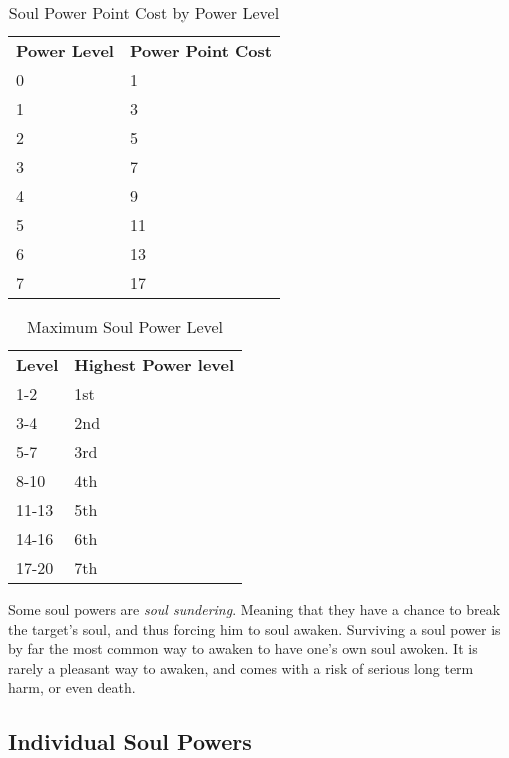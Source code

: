 \begin{table}[!htb]
  \caption{Soul Power Point Cost by Power Level}
  \begin{tabular}{p{2cm} p{3cm}}
    \textbf{Power Level} & \textbf{Power Point Cost} \\
    0 &  1 \\
    1 &  3 \\
    2 &  5 \\
    3 &  7 \\
    4 &  9 \\
    5 & 11 \\
    6 & 13 \\
    7 & 17 \\
  \end{tabular}
\end{table}

\begin{table}[!htb]
  \caption{Maximum Soul Power Level}
  \begin{tabular}{p{2cm} p{3cm}}
    \textbf{Level} & \textbf{Highest Power level} \\
    1-2   & 1st \\
    3-4   & 2nd \\
    5-7   & 3rd \\
    8-10  & 4th \\
    11-13 & 5th \\
    14-16 & 6th \\
    17-20 & 7th \\
  \end{tabular}
\end{table}

Some soul powers are \emph{soul sundering}. Meaning that they have a chance
to break the target's soul, and thus forcing him to soul awaken. Surviving a
soul power is by far the most common way to awaken to have one's own soul
awoken. It is rarely a pleasant way to awaken, and comes with a risk of
serious long term harm, or even death.

\subsection{Individual Soul Powers}

